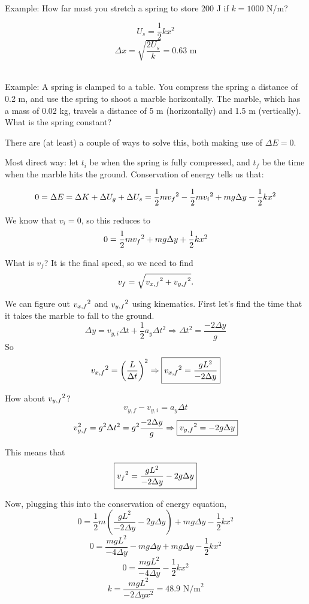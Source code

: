 \hrulefill\\
Example: How far must you stretch a spring to store 200 J if $k=1000$ N/m?

$$U_s=\frac{1}{2}kx^2$$
$$\Delta{x}=\sqrt{\frac{2U_s}{k}}=0.63\mbox{ m}$$

\hrulefill\\
Example: A spring is clamped to a table. You compress the spring a distance of 0.2 m, and use the spring to shoot a marble horizontally. The marble, which has a mass of 0.02 kg, travels a distance of 5 m (horizontally) and 1.5 m (vertically). What is the spring constant?

There are (at least) a couple of ways to solve this, both making use of $\Delta{E}=0$.

Most direct way: let $t_i$ be when the spring is fully compressed, and $t_f$ be the time when the marble hits the ground. Conservation of energy tells us that:

$$0=\Delta{E}=\Delta{K}+\Delta{U_g}+\Delta{U_s}=\frac{1}{2}mv_f\displaystyle^2-\frac{1}{2}mv_i\displaystyle^2+mg\Delta{y}-\frac{1}{2}kx\displaystyle^2$$

We know that $v_i=0$, so this reduces to
$$0=\frac{1}{2}mv_f\displaystyle^2+mg\Delta{y}+\frac{1}{2}kx\displaystyle^2$$

What is $v_f$? It is the final speed, so we need to find
$$v_f=\sqrt{v_{x,f}\displaystyle^2+v_{y,f}\displaystyle^2}.$$

We can figure out $v_{x,f}\displaystyle^2$ and $v_{y,f}\displaystyle^2$ using kinematics. First let's find the time that it takes the marble to fall to the ground.
$$\Delta{y}=v_{y,i}\Delta{t}+\frac{1}{2}a_y\Delta{t}^2\Rightarrow \boxed{\Delta{t}^2=\frac{-2\Delta{y}}{g}}$$
So
$$v_{x,f}\displaystyle^2=\left(\frac{L}{\Delta{t}}\right)^2\Rightarrow \boxed{v_{x,f}\displaystyle^2=\frac{gL^2}{-2\Delta{y}}}$$

How about $v_{y,f}\displaystyle^2$?
$$v_{y,f}-v_{y,i}=a_y\Delta{t}$$
$$v_{y,f}^2=g^2\Delta{t}^2=g^2\frac{-2\Delta{y}}{g}\Rightarrow \boxed{v_{y,f}\displaystyle^2=-2g\Delta{y}}$$

This means that
$$\boxed{v_f\displaystyle^2=\frac{gL^2}{-2\Delta{y}}-2g\Delta{y}}$$

Now, plugging this into the conservation of energy equation,
$$0=\frac{1}{2}m\left(\frac{gL^2}{-2\Delta{y}}-2g\Delta{y}\right)+mg\Delta{y}-\frac{1}{2}kx^2$$
$$0=\frac{mgL^2}{-4\Delta{y}}-mg\Delta{y}+mg\Delta{y}-\frac{1}{2}kx^2$$
$$0=\frac{mgL^2}{-4\Delta{y}}-\frac{1}{2}kx^2$$
$$k=\frac{mgL^2}{-2\Delta{y}x^2}=\boxed{48.9\mbox{ N/m}^2}$$

\clearpage

